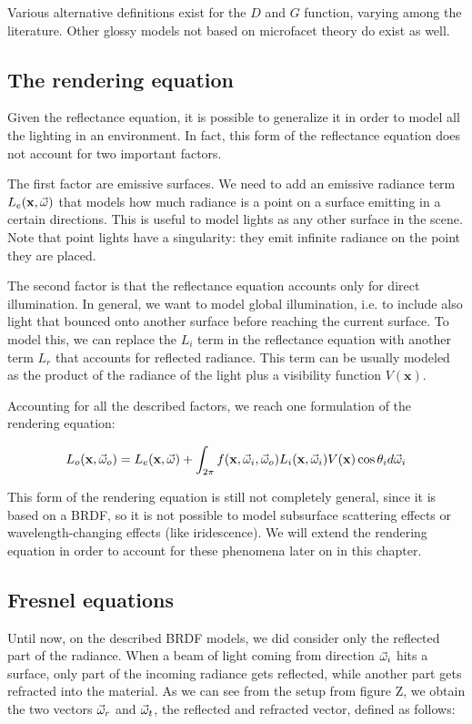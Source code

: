 Various alternative definitions exist for the $D$ and $G$ function, varying among the literature. Other glossy models not based on microfacet theory do exist as well. 

\subsection{The rendering equation}

Given the reflectance equation, it is possible to generalize it in order to model all the lighting in an environment. In fact, this form of the reflectance equation does not account for two important factors. 

The first factor are emissive surfaces. We need to add an emissive radiance term $L_e(\mathbf{x}, \vec{\omega})$ that models how much radiance is a point on a surface emitting in a certain directions. This is useful to model lights as any other surface in the scene. Note that point lights have a singularity: they emit infinite radiance on the point they are placed.

The second factor is that the reflectance equation accounts only for direct illumination. In general, we want to model global illumination, i.e. to include also light that bounced onto another surface before reaching the current surface. To model this, we can replace the $L_i$ term in the reflectance equation with another term $L_r$ that accounts for reflected radiance. This term can be usually modeled as the product of the radiance of the light plus a visibility function $V(\mathbf{x})$.

Accounting for all the described factors, we reach one formulation of the rendering equation:

$$
L_o(\mathbf{x}, \vec{\omega}_o) = L_e(\mathbf{x}, \vec{\omega}) + \int_{2\pi} f(\mathbf{x}, \vec{\omega}_i, \vec{\omega}_o) L_i(\mathbf{x}, \vec{\omega}_i) V(\mathbf{x}) \cos\theta_i d\vec{\omega}_i
$$

This form of the rendering equation is still not completely general, since it is based on a BRDF, so it is not possible to model subsurface scattering effects or wavelength-changing effects (like iridescence). We will extend the rendering equation in order to account for these phenomena later on in this chapter.

\subsection{Fresnel equations}

Until now, on the described BRDF models, we did consider only the reflected part of the radiance. When a beam of light coming from direction $\vec{\omega}_i$ hits a surface, only part of the incoming radiance gets reflected, while another part gets refracted into the material. As we can see from the setup from figure Z, we obtain the two vectors $\vec{\omega}_r$ and $\vec{\omega}_t$, the reflected and refracted vector, defined as follows:

